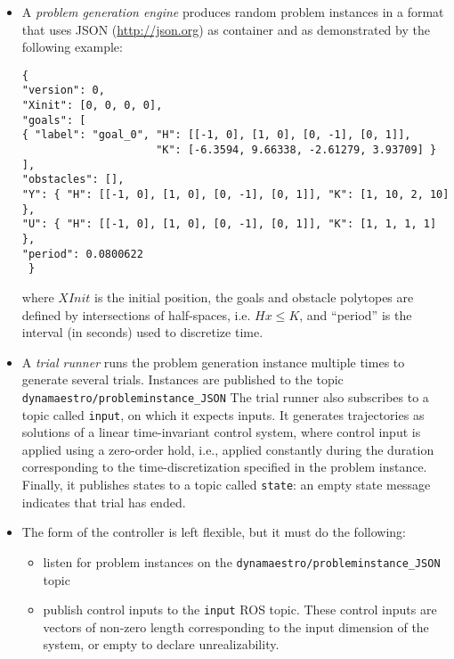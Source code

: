 \documentclass{amsart}
\theoremstyle{definition}
\begin{document}
\begin{itemize}
\item A \emph{problem generation engine} produces random problem instances
in a format that uses JSON (\url{http://json.org}) as container and as demonstrated by the following example:
\begin{small}
\begin{verbatim}
{
"version": 0,
"Xinit": [0, 0, 0, 0],
"goals": [
{ "label": "goal_0", "H": [[-1, 0], [1, 0], [0, -1], [0, 1]], 
                     "K": [-6.3594, 9.66338, -2.61279, 3.93709] }
],
"obstacles": [],
"Y": { "H": [[-1, 0], [1, 0], [0, -1], [0, 1]], "K": [1, 10, 2, 10] },
"U": { "H": [[-1, 0], [1, 0], [0, -1], [0, 1]], "K": [1, 1, 1, 1] },
"period": 0.0800622
 }
\end{verbatim}
\end{small}

where $XInit$ is the initial position, the goals and obstacle polytopes are defined by intersections
of half-spaces, i.e. $Hx \le K$, and ``period'' is the interval (in seconds) used to discretize time.

\item A \emph{trial runner} runs the problem generation instance multiple times to generate
several trials. Instances are published to the topic \texttt{dynamaestro/probleminstance\_JSON}
The trial runner also subscribes to a topic called \texttt{input}, on which it expects inputs. It
generates trajectories as solutions of a linear time-invariant control system, where control
input is applied using a zero-order hold, i.e., applied constantly during the duration
corresponding to the time-discretization specified in the problem instance. Finally, it publishes
states to a topic called \texttt{state}: an empty state message indicates that trial has ended.

\item The form of the controller is left flexible, but it must do the following:

\begin{itemize}
\item listen for problem instances on the \texttt{dynamaestro/probleminstance\_JSON} topic
\item publish control inputs to the \texttt{input} ROS topic. These control inputs are vectors of non-zero length corresponding to the input dimension of
the system, or empty to declare unrealizability.
\end{itemize}

\end{itemize}
\end{document}
